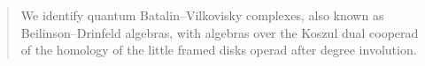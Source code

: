 \begin{abstract}
	We identify quantum Batalin--Vilkovisky complexes, also known as Beilinson--Drinfeld algebras, with algebras over the Koszul dual cooperad of the homology of the little framed disks operad after degree involution.
\end{abstract}